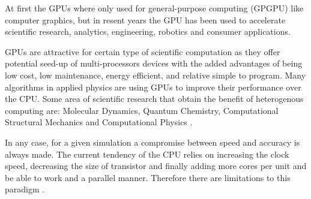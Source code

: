 At first the GPUs where only used for general-purpose computing (GPGPU) like computer graphics, but in resent years the GPU has been used to accelerate scientific research, analytics, engineering, robotics and consumer applications.

GPUs are attractive for certain type of scientific computation as they offer potential seed-up of multi-processors devices with the added advantages of being low cost, low maintenance, energy efficient, and relative simple to program. Many algorithms in applied physics are using GPUs to improve their performance over the CPU. Some area of scientific research that obtain the benefit of heterogenous computing are: Molecular Dynamics, Quantum Chemistry, Computational Structural Mechanics and Computational Physics \cite{applications}.

In any case, for a given simulation a compromise between speed and accuracy is always made. The current tendency of the CPU relies on increasing the clock speed, decreasing the size of transistor and finally adding more cores per unit and be able to work and a parallel manner. Therefore there are limitations to this paradigm \cite{quantitative}.

